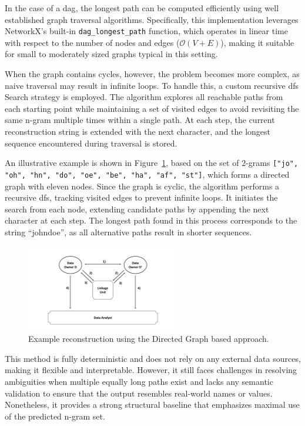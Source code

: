 In the case of a \ac{dag}, the longest path can be computed efficiently using well established graph traversal algorithms.
Specifically, this implementation leverages NetworkX’s built-in \texttt{dag\_longest\_path} function, which operates in linear time with respect to the number of nodes and edges (\( \mathcal{O}(V + E) \)), making it suitable for small to moderately sized graphs typical in this setting.


When the graph contains cycles, however, the problem becomes more complex, as naive traversal may result in infinite loops.
To handle this, a custom recursive \ac{dfs} Search strategy is employed.
The algorithm explores all reachable paths from each starting point while maintaining a set of visited edges to avoid revisiting the same n-gram multiple times within a single path.
At each step, the current reconstruction string is extended with the next character, and the longest sequence encountered during traversal is stored.

An illustrative example is shown in Figure~\ref{fig:graphreconstruction}, based on the set of 2-grams \texttt{["jo", "oh", "hn", "do", "oe", "be", "ha", "af", "st"]}, which forms a directed graph with eleven nodes.
Since the graph is cyclic, the algorithm performs a recursive \ac{dfs}, tracking visited edges to prevent infinite loops.
It initiates the search from each node, extending candidate paths by appending the next character at each step.
The longest path found in this process corresponds to the string \enquote{johndoe}, as all alternative paths result in shorter sequences.

\begin{figure}[H]
\centering
\includegraphics[width=0.6\textwidth, page=18]{img/visualization.pdf}
\caption{Example reconstruction using the Directed Graph based approach.}
\label{fig:graphreconstruction}
\end{figure}

This method is fully deterministic and does not rely on any external data sources, making it flexible and interpretable.
However, it still faces challenges in resolving ambiguities when multiple equally long paths exist and lacks any semantic validation to ensure that the output resembles real-world names or values.
Nonetheless, it provides a strong structural baseline that emphasizes maximal use of the predicted n-gram set.

